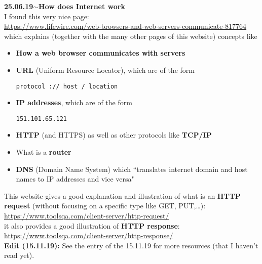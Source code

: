 \documentclass[11pt,a4paper]{article}
\newenvironment{loggentry}[2]%
{\noindent\textbf{#1}\hspace{1cm}$\mathbf{\sim}$\text{ }\textbf{#2}\\}{\vspace{0.5cm}}
\begin{document}
\begin{loggentry}{25.06.19}{How does Internet work}

I found this very nice page:\\
\url{https://www.lifewire.com/web-browsers-and-web-servers-communicate-817764}\\
which explains (together with the many other pages of this website) concepts like
\begin{itemize}
\item \textbf{How a web browser communicates with servers}
\item \textbf{URL} (Uniform Resource Locator), which are of the form
\begin{verbatim}
protocol :// host / location
\end{verbatim}
\item \textbf{IP addresses}, which are of the form
\begin{verbatim}
151.101.65.121
\end{verbatim}
\item \textbf{HTTP} (and HTTPS) as well as other protocols like \textbf{TCP/IP}
\item What is a \textbf{router}
\item \textbf{DNS} (Domain Name System) which ``translates internet domain and host names to IP addresses and vice versa"
\end{itemize}
This website gives a good explanation and illustration of what is an \textbf{HTTP request} (without focusing on a specific type like GET, PUT,\dots):\\
\url{https://www.toolsqa.com/client-server/http-request/}\\
it also provides a good illustration of \textbf{HTTP response}:\\
\url{https://www.toolsqa.com/client-server/http-response/}\\

\textbf{Edit (15.11.19):} See the entry of the 15.11.19 for more resources (that I haven't read yet).\\


\end{loggentry}
\end{document}
